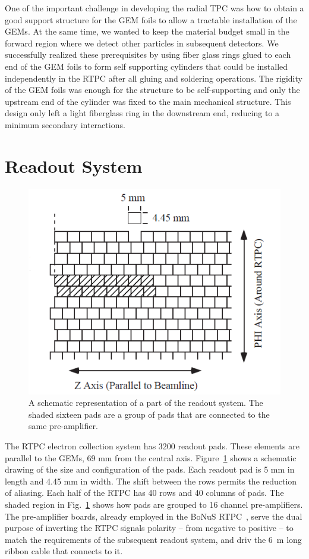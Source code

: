 \documentclass[preprint,5p]{elsarticle}
\begin{document}
One of the important challenge in developing the radial TPC was how to obtain a 
good support structure for the GEM foils to allow a tractable 
installation of the GEMs. At the same time, we wanted to 
keep the material budget small in the forward region where we detect other 
particles in subsequent detectors. We successfully realized these prerequisites 
by using fiber glass rings glued to each end of the GEM foils to form self 
supporting cylinders that could be installed independently in the RTPC after 
all gluing and soldering operations. The rigidity of the GEM foils was enough
for the structure to be self-supporting and only the upstream end of the cylinder 
was fixed to the main mechanical structure. This design only left a 
light fiberglass ring in the downstream end, reducing to a minimum secondary 
interactions.

\section{Readout System} \label{sec_readout}

\begin{figure}[tb]
   \centering
   \includegraphics[scale=0.55]{fig/PADs.png}
   \caption[]{A schematic representation of a part of the readout system.  The 
   shaded sixteen pads are a group of pads that are connected to the same 
pre-amplifier.} \label{fig:PADs}
\end{figure}

The RTPC electron collection system has 3200 readout pads. These elements are
parallel to the GEMs, 69 mm from the central axis.
Figure~\ref{fig:PADs} shows a schematic drawing of the size and 
configuration of the pads. Each readout pad is 5 mm in length and 4.45 mm in 
width. The shift between the rows permits the reduction of aliasing. Each half of the 
RTPC has 40 rows and 40 columns of pads. The shaded region in Fig.~\ref{fig:PADs} 
shows how pads are grouped to 16 channel pre-amplifiers. The pre-amplifier boards, 
already employed in the BoNuS RTPC~\cite{BONUS-NIM}, serve the dual purpose of 
inverting the RTPC signals polarity -- from negative to positive -- to match the 
requirements of the subsequent readout system, and driv the 6~m long ribbon 
cable that connects to it.
\end{document}
